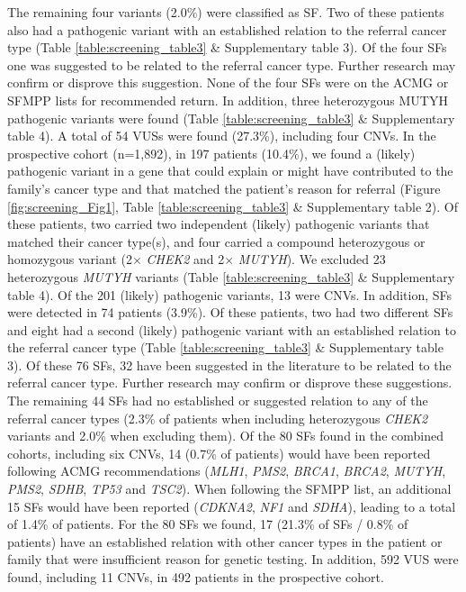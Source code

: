 The remaining four variants (2.0\%) were classified as SF. 
Two of these patients also had a pathogenic variant with an established relation to the referral cancer type (Table \ref{table:screening_table3} \& Supplementary table 3). 
Of the four SFs one was suggested to be related to the referral cancer type. 
Further research may confirm or disprove this suggestion. None of the four SFs were on the ACMG or SFMPP lists for recommended return. 
In addition, three heterozygous MUTYH pathogenic variants were found (Table \ref{table:screening_table3} \& Supplementary table 4). %
A total of 54 VUSs were found (27.3\%), including four CNVs. 
In the prospective cohort (n=1,892), in 197 patients (10.4\%), we found a (likely) pathogenic variant in a gene that could explain or might have contributed to the family’s cancer type and that matched the patient’s reason for referral (Figure \ref{fig:screening_Fig1}, Table \ref{table:screening_table3} \& Supplementary table 2). %
Of these patients, two carried two independent (likely) pathogenic variants that matched their cancer type(s), and four carried a compound heterozygous or homozygous variant (2$\times$  \textsl{CHEK2} and 2$\times$  \textsl{MUTYH}). 
We excluded 23 heterozygous \textsl{MUTYH} variants (Table \ref{table:screening_table3} \& Supplementary table 4). %
Of the 201 (likely) pathogenic variants, 13 were CNVs. In addition, SFs were detected in 74 patients (3.9\%). 
Of these patients, two had two different SFs and eight had a second (likely) pathogenic variant with an established relation to the referral cancer type (Table \ref{table:screening_table3} \& Supplementary table 3). 
Of these 76 SFs, 32 have been suggested in the literature to be related to the referral cancer type. 
Further research may confirm or disprove these suggestions. The remaining 44 SFs had no established or suggested relation to any of the referral cancer types (2.3\% of patients when including heterozygous \textsl{CHEK2} variants and 2.0\% when excluding them). 
Of the 80 SFs found in the combined cohorts, including six CNVs, 14 (0.7\% of patients) would have been reported following ACMG recommendations (\textsl{MLH1}, \textsl{PMS2}, \textsl{BRCA1}, \textsl{BRCA2}, \textsl{MUTYH}, \textsl{PMS2}, \textsl{SDHB}, \textsl{TP53} and \textsl{TSC2}). 
When following the SFMPP list, an additional 15 SFs would have been reported (\textsl{CDKNA2}, \textsl{NF1} and \textsl{SDHA}), leading to a total of 1.4\% of patients. 
For the 80 SFs we found, 17 (21.3\% of SFs / 0.8\% of patients) have an established relation with other cancer types in the patient or family that were insufficient reason for genetic testing. 
In addition, 592 VUS were found, including 11 CNVs, in 492 patients in the prospective cohort.


